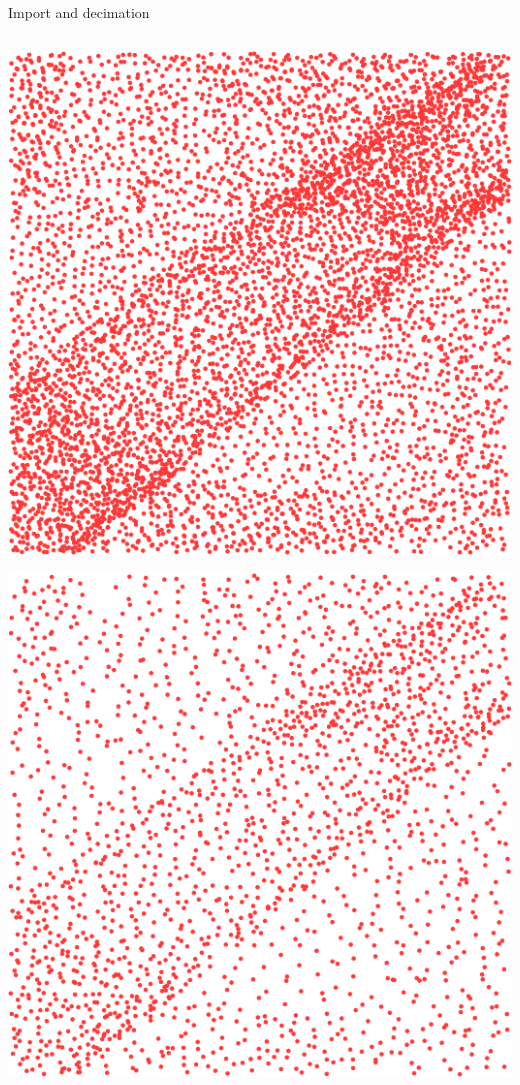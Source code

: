 \documentclass[xcolor={dvipsnames,usenames},beamer,aspectratio=169]{beamer}
\begin{document}
\begin{frame}{Import and decimation}
\begin{columns}
\begin{column}{0.22\textwidth}
\begin{center}
\includegraphics[width=\textwidth]{features/full}

\smallskip

\includegraphics[width=\textwidth]{features/preserve}

\end{center}

\end{column}
\end{columns}

\end{frame}
\end{document}
